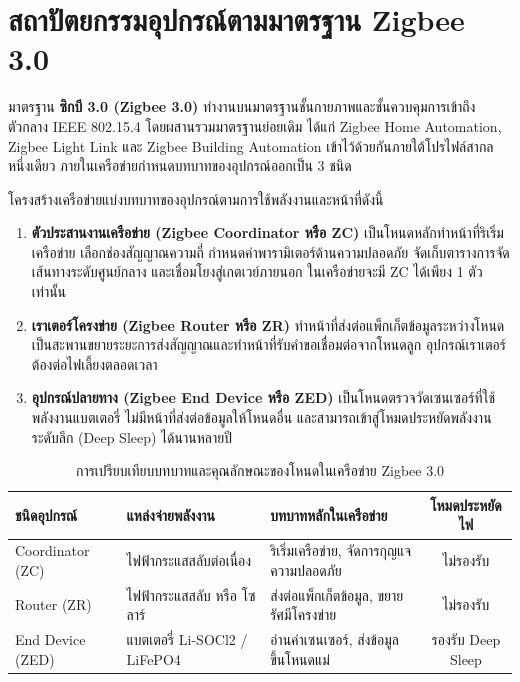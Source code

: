 \section{สถาปัตยกรรมอุปกรณ์ตามมาตรฐาน Zigbee 3.0}

มาตรฐาน \textbf{ซิกบี 3.0 (Zigbee 3.0)} ทำงานบนมาตรฐานชั้นกายภาพและชั้นควบคุมการเข้าถึงตัวกลาง IEEE 802.15.4 โดยผสานรวมมาตรฐานย่อยเดิม ได้แก่ Zigbee Home Automation, Zigbee Light Link และ Zigbee Building Automation เข้าไว้ด้วยกันภายใต้โปรไฟล์สากลหนึ่งเดียว ภายในเครือข่ายกำหนดบทบาทของอุปกรณ์ออกเป็น 3 ชนิด

\begin{protocolbox}
โครงสร้างเครือข่ายแบ่งบทบาทของอุปกรณ์ตามการใช้พลังงานและหน้าที่ดังนี้
\begin{enumerate}
    \item \textbf{ตัวประสานงานเครือข่าย (Zigbee Coordinator หรือ ZC)} เป็นโหนดหลักทำหน้าที่ริเริ่มเครือข่าย เลือกช่องสัญญาณความถี่ กำหนดค่าพารามิเตอร์ด้านความปลอดภัย จัดเก็บตารางการจัดเส้นทางระดับศูนย์กลาง และเชื่อมโยงสู่เกตเวย์ภายนอก ในเครือข่ายจะมี ZC ได้เพียง 1 ตัวเท่านั้น
    \item \textbf{เราเตอร์โครงข่าย (Zigbee Router หรือ ZR)} ทำหน้าที่ส่งต่อแพ็กเก็ตข้อมูลระหว่างโหนด เป็นสะพานขยายระยะการส่งสัญญาณและทำหน้าที่รับคำขอเชื่อมต่อจากโหนดลูก อุปกรณ์เราเตอร์ต้องต่อไฟเลี้ยงตลอดเวลา
    \item \textbf{อุปกรณ์ปลายทาง (Zigbee End Device หรือ ZED)} เป็นโหนดตรวจวัดเซนเซอร์ที่ใช้พลังงานแบตเตอรี่ ไม่มีหน้าที่ส่งต่อข้อมูลให้โหนดอื่น และสามารถเข้าสู่โหมดประหยัดพลังงานระดับลึก (Deep Sleep) ได้นานหลายปี
\end{enumerate}
\end{protocolbox}

\begin{table}[H]
\caption{การเปรียบเทียบบทบาทและคุณลักษณะของโหนดในเครือข่าย Zigbee 3.0}
\label{tab:zigbee_device_roles}
\centering
\small
\begin{tabularx}{\textwidth}{p{3.2cm} >{\raggedright\arraybackslash}X >{\raggedright\arraybackslash}X c}
\toprule
\textbf{ชนิดอุปกรณ์} & \textbf{แหล่งจ่ายพลังงาน} & \textbf{บทบาทหลักในเครือข่าย} & \textbf{โหมดประหยัดไฟ} \\
\midrule
Coordinator (ZC) & ไฟฟ้ากระแสสลับต่อเนื่อง & ริเริ่มเครือข่าย, จัดการกุญแจความปลอดภัย & ไม่รองรับ \\
Router (ZR) & ไฟฟ้ากระแสสลับ หรือ โซลาร์ & ส่งต่อแพ็กเก็ตข้อมูล, ขยายรัศมีโครงข่าย & ไม่รองรับ \\
End Device (ZED) & แบตเตอรี่ Li-SOCl2 / LiFePO4 & อ่านค่าเซนเซอร์, ส่งข้อมูลขึ้นโหนดแม่ & รองรับ Deep Sleep \\
\bottomrule
\end{tabularx}
\end{table}

